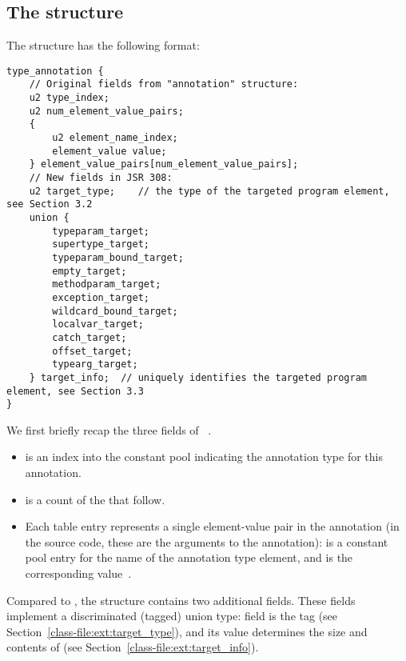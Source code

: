 \documentclass[10pt]{article}
\begin{document}
\subsection{The  structure\label{class-file:ext}}

The \extendedannotation structure has the following format:

\preverbnegspace
\begin{Verbatim}
type_annotation {
    // Original fields from "annotation" structure:
    u2 type_index;
    u2 num_element_value_pairs;
    {
        u2 element_name_index;
        element_value value;
    } element_value_pairs[num_element_value_pairs];
    // New fields in JSR 308:
    u2 target_type;    // the type of the targeted program element, see Section 3.2
    union {
        typeparam_target;
        supertype_target;
        typeparam_bound_target;
        empty_target;
        methodparam_target;
        exception_target;
        wildcard_bound_target;
        localvar_target;
        catch_target;
        offset_target;
        typearg_target;
    } target_info;  // uniquely identifies the targeted program element, see Section 3.3
}
\end{Verbatim}



We first briefly recap
the three fields of ~\cite[\S 4.8.15]{LindholmY99:CFF5}.

\begin{itemize}
\item {} is an index into the constant pool indicating the
  annotation type for this annotation.
\item {} is a count of the
   that follow.
\item Each  table entry represents a single
  element-value pair in the annotation (in the source code, these are the
  arguments to the annotation):   is a
  constant pool entry for the name of the annotation type element, and
   is the corresponding value~\cite[\S 4.8.15.1]{LindholmY99:CFF5}.
\end{itemize}

Compared to ,
the \extendedannotation structure contains two additional fields.
These fields implement a discriminated (tagged) union type:
field  is the tag (see
Section~\ref{class-file:ext:target_type}), and its value determines the
size and
contents of  (see Section~\ref{class-file:ext:target_info}).
\end{document}
